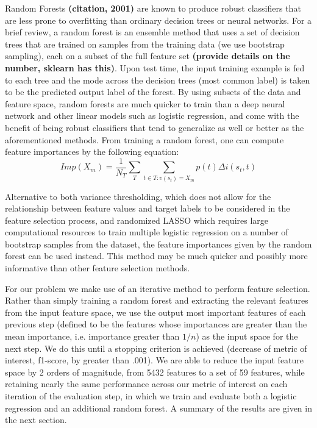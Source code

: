 \documentclass{article}
\begin{document}
Random Forests \textbf{(citation, 2001)} are known to produce robust classifiers that are less prone to overfitting than ordinary decision trees or neural networks. For a brief review, a random forest is an ensemble method that uses a set of decision trees that are trained on samples from the training data (we use bootstrap sampling), each on a subset of the full feature set \textbf{(provide details on the number, sklearn has this)}. Upon test time, the input training example is fed to each tree and the mode across the decision trees (most common label) is taken to be the predicted output label of the forest. By using subsets of the data and feature space, random forests are much quicker to train than a deep neural network and other linear models such as logistic regression, and come with the benefit of being robust classifiers that tend to generalize as well or better as the aforementioned methods. From training a random forest, one can compute feature importances by the following equation:
\begin{equation}
Imp(X_{m}) = \frac{1}{N_{T}}\sum_{T}\sum_{t \in T:v(s_{t}) = X_{m}}p(t)\Delta i(s_t,t)
\end{equation}

Alternative to both variance thresholding, which does not allow for the relationship between feature values and target labels to be considered in the feature selection process, and randomized LASSO which requires large computational resources to train multiple logistic regression on a number of bootstrap samples from the dataset, the feature importances given by the random forest can be used instead. This method may be much quicker and possibly more informative than other feature selection methods. 

For our problem we make use of an iterative method to perform feature selection. Rather than simply training a random forest and extracting the relevant features from the input feature space, we use the output most important features of each previous step (defined to be the features whose importances are greater than the mean importance, i.e. importance greater than $1/n$) as the input space for the next step. We do this until a stopping criterion is achieved (decrease of metric of interest, f1-score, by greater than .001). We are able to reduce the input feature space by 2 orders of magnitude, from 5432 features to a set of 59 features, while retaining nearly the same performance across our metric of interest on each iteration of the evaluation step, in which we train and evaluate both a logistic regression and an additional random forest. A summary of the results are given in the next section.
\end{document}
